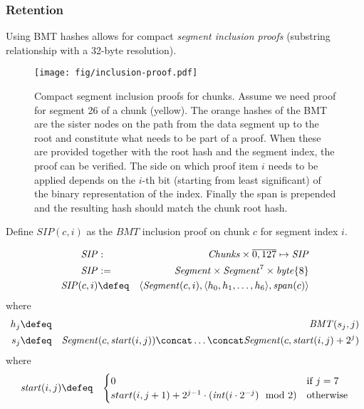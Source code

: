 \subsubsection{Retention}

Using BMT hashes allows for compact \emph{segment inclusion proofs} (substring relationship with a 32-byte resolution).

\begin{figure}[htbp]
\centering
\texttt{[image: fig/inclusion-proof.pdf]}
\caption[Compact segment inclusion proofs for chunks ]{Compact segment inclusion proofs for chunks. Assume we need proof for segment 26 of a chunk (yellow). The orange hashes of the BMT are the sister nodes on the path from the data segment up to the root and constitute what needs to be part of a proof. When these are provided together with the root hash and the segment index, the proof can be verified. The side on which proof item $i$ needs to be applied depends on the $i$-th bit (starting from least significant) of the binary representation of the index. Finally the span is prepended and the resulting hash should match the chunk root hash.}
\label{fig:chunk-inclusion}
\end{figure}

\begin{definition}
\label{def:sip}
Define  $\mathit{SIP}(c,i)$ as the $\mathit{BMT}$ inclusion proof on chunk $c$ for segment index $i$.

\begin{eqnarray}
\mathit{SIP}&: &\mathit{Chunks}\times \overline{0,127} \mapsto \mathit{SIP}\\
\mathit{SIP} &:=&\mathit{Segment}\times\mathit{Segment}^7\times \mathit{byte}\{8\}
\\
\mathit{SIP}(c,i) &\defeq &\langle \mathit{Segment}(c,i),\langle h_0, h_1, \ldots, h_6\rangle, \mathit{span}(c)\rangle  
\end{eqnarray}
where
\begin{eqnarray}
h_j&\defeq& \mathit{BMT}(s_j,j)\\
s_j&\defeq&\mathit{Segment}(c,\mathit{start}(i,j))\concat \ldots \concat \mathit{Segment}(c,\mathit{start}(i,j)+2^j)\\
\end{eqnarray}
where
\begin{eqnarray}
\mathit{start}(i,j)&\defeq&
\begin{cases}
0 &\text{if } j=7\\
start(i,j+1)+2^{j-1}\cdot (\mathit{int}(i\cdot 2^{-j}) \mod 2) &\text{otherwise}
\end{cases}
\end{eqnarray}
\end{definition}


